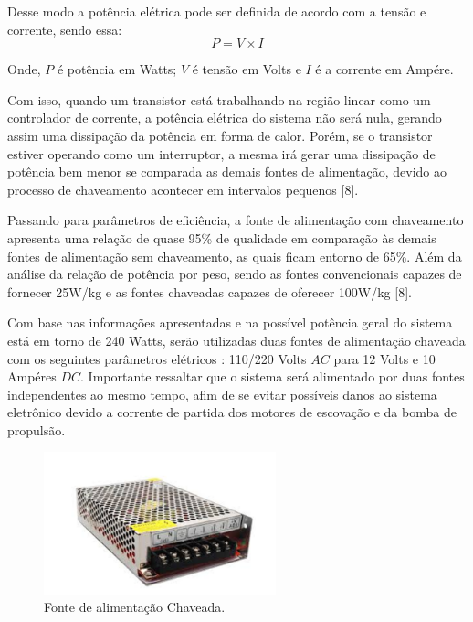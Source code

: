 Desse modo a potência elétrica pode ser definida de acordo com a tensão e corrente, sendo essa:
\begin{equation} \label{eq:potencia}
  P = V \times I
\end{equation}

Onde, $P$ é potência em Watts; $V$ é tensão em Volts e $I$ é a corrente em Ampére.

Com isso, quando um transistor está trabalhando na região linear como um controlador de corrente, a potência elétrica do sistema não será nula, gerando assim uma dissipação da potência em forma de calor. Porém, se o transistor estiver operando como um interruptor, a mesma irá gerar uma dissipação de potência bem menor se comparada as demais fontes de alimentação, devido ao processo de chaveamento acontecer em intervalos pequenos [8].

Passando para parâmetros de eficiência, a fonte de alimentação com chaveamento apresenta uma relação de quase 95\% de qualidade em comparação às demais fontes de alimentação sem chaveamento, as quais ficam entorno de 65\%. Além da análise da relação de potência por peso, sendo as fontes convencionais capazes de fornecer 25W/kg e as fontes chaveadas capazes de oferecer 100W/kg [8].

Com base nas informações apresentadas e na possível potência geral do sistema está em torno de 240 Watts, serão utilizadas duas fontes de alimentação chaveada com os seguintes parâmetros elétricos : 110/220 Volts $AC$ para 12 Volts e 10 Ampéres $DC$. Importante ressaltar que o sistema será alimentado por duas fontes independentes ao mesmo tempo, afim de se evitar possíveis danos ao sistema eletrônico devido a corrente de partida dos motores de escovação e da bomba de propulsão.
\par
\begin{figure}[h]
  \centering
  \includegraphics[width=0.6\textwidth]{figures/power-supply.png}
  \caption{Fonte de alimentação Chaveada.}
  \label{fig:power-supply}
\end{figure}
\FloatBarrier
\par
